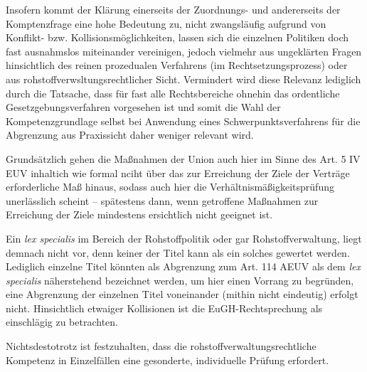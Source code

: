 \documentclass[12pt,a4paper,oneside]{book} %
\begin{document}
	Insofern kommt der Klärung einerseits der Zuordnungs- und andererseits der Komptenzfrage eine hohe Bedeutung zu, nicht zwangsläufig aufgrund von Konflikt- bzw. Kollisionsmöglichkeiten, lassen sich die einzelnen Politiken doch fast ausnahmslos miteinander vereinigen, jedoch vielmehr aus ungeklärten Fragen hinsichtlich des reinen prozedualen Verfahrens (im Rechtsetzungsprozess) oder aus rohstoffverwsltungsrechtlicher Sicht. Vermindert wird diese Relevanz lediglich durch die Tatsache, dass für fast alle Rechtsbereiche ohnehin das ordentliche Gesetzgebungsverfahren vorgesehen ist und somit die Wahl der Kompetenzgrundlage selbst bei Anwendung eines Schwerpunktsverfahrens für die Abgrenzung aus Praxissicht daher weniger relevant wird. 
	
	Grundsätzlich gehen die Maßnahmen der Union auch hier im Sinne des Art. 5 IV EUV \glqq inhaltich wie formal nciht über das zur Erreichung der Ziele der Verträge erforderliche Maß hinaus\grqq, sodass auch hier die Verhältnismäßigkeitsprüfung unerlässlich scheint -- spätestens dann, wenn getroffene Maßnahmen zur Erreichung der Ziele mindestens ersichtlich nicht geeignet ist.\autocite{Gundel in Dause/Ludwigs, M., Rn 45 iVm u. mwN v. Danwitz EWS 2003 393ff.}
	
	Ein \textit{lex specialis} im Bereich der Rohstoffpolitik oder gar Rohstoffverwaltung, liegt demnach nicht vor, denn keiner der Titel kann als ein solches gewertet werden. Lediglich einzelne Titel könnten als Abgrenzung zum Art. 114 AEUV als dem \textit{lex specialis} näherstehend bezeichnet werden, um hier einen Vorrang zu begründen,\autocite{Calliies, Berliner Beiträge 52, S. 18ff., mwN Hamer in von der Groeben/schwarze/Hatje 2015, Art. 194, Rn. 26} eine Abgrenzung der einzelnen Titel voneinander (mithin nicht eindeutig)\autocite{Gundel EWS 2011, 25, 29; Kahl EuR 2009, 601, 608} erfolgt nicht.  Hinsichtlich etwaiger Kollisionen ist die EuGH-Rechtsprechung als einschlägig zu betrachten.
	
	Nichtsdestotrotz ist festzuhalten, dass die rohstoffverwaltungsrechtliche Kompetenz in Einzelfällen eine gesonderte, individuelle Prüfung erfordert.
	
\end{document}
